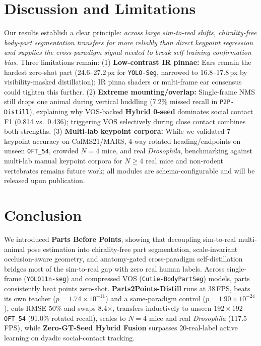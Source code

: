 \documentclass[10pt,twocolumn,letterpaper]{article}
\begin{document}
\section{Discussion and Limitations}

Our results establish a clear principle: \emph{across large sim-to-real shifts, chirality-free body-part segmentation transfers far more reliably than direct keypoint regression and supplies the cross-paradigm signal needed to break self-training confirmation bias.} Three limitations remain: (1) \textbf{Low-contrast IR pinnae:} Ears remain the hardest zero-shot part (24.6--27.2\,px for \texttt{YOLO-Seg}, narrowed to 16.8--17.8\,px by visibility-masked distillation); IR pinna shaders or multi-frame ear consensus could tighten this further. (2) \textbf{Extreme mounting/overlap:} Single-frame NMS still drops one animal during vertical huddling (7.2\% missed recall in \texttt{P2P-Distill}), explaining why VOS-backed \textbf{Hybrid 0-seed} dominates social contact F1 (0.814 vs.\ 0.436); triggering VOS selectively during close contact combines both strengths. (3) \textbf{Multi-lab keypoint corpora:} While we validated 7-keypoint accuracy on CalMS21/MARS, 4-way rotated heading/endpoints on unseen \texttt{OFT\_54}, crowded $N=4$ mice, and real \emph{Drosophila}, benchmarking against multi-lab manual keypoint corpora for $N\ge 4$ real mice and non-rodent vertebrates remains future work; all modules are schema-configurable and will be released upon publication.

\section{Conclusion}

We introduced \textbf{Parts Before Points}, showing that decoupling sim-to-real multi-animal pose estimation into chirality-free part segmentation, scale-invariant occlusion-aware geometry, and anatomy-gated cross-paradigm self-distillation bridges most of the sim-to-real gap with zero real human labels. Across single-frame (\texttt{YOLO11n-seg}) and compressed VOS (\texttt{Cutie-BodyPartSeg}) models, parts consistently beat points zero-shot. \textbf{Parts2Points-Distill} runs at 38\,FPS, beats its own teacher ($p=1.74\times 10^{-11}$) and a same-paradigm control ($p=1.90\times 10^{-24}$), cuts RMSE 50\% and swaps 8.4$\times$, transfers inductively to unseen $192\times 192$ \texttt{OFT\_54} (91.0\% rotated recall), scales to $N=4$ mice and real \emph{Drosophila} (117.5\,FPS), while \textbf{Zero-GT-Seed Hybrid Fusion} surpasses 20-real-label active learning on dyadic social-contact tracking.
\end{document}
